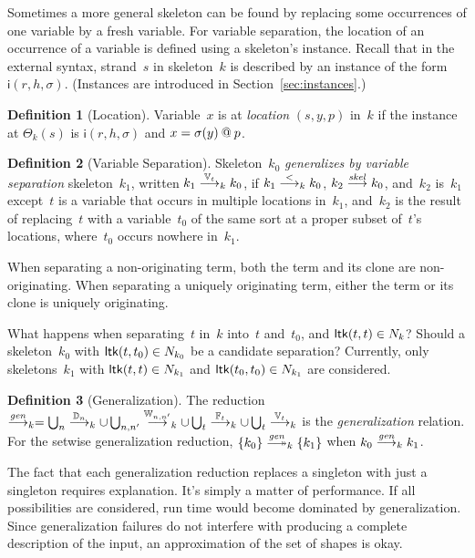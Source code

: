 \documentclass[12pt]{report}
\theoremstyle{definition}
\newtheorem{defn}{Definition}[chapter]
\newenvironment{note}{\itshape\par}{}
\newcommand{\inst}{\mathsf{i}}
\begin{document}
Sometimes a more general skeleton can be found by replacing some
occurrences of one variable by a fresh variable.  For variable
separation, the location of an occurrence of a variable is defined
using a skeleton's instance.  Recall that in the external syntax,
strand~$s$ in skeleton~$k$ is described by an instance of the form
$\inst(r,h,\sigma)$.  (Instances are introduced in
Section~\ref{sec:instances}.)

\begin{defn}[Location]
Variable~$x$ is at \emph{location} $(s,y,p)$ in~$k$ if
the instance at $\Theta_k(s)$ is $\inst(r,h,\sigma)$ and
$x=\sigma(y)\mathbin{@} p$.
\end{defn}

\begin{defn}[Variable Separation]
Skeleton~$k_0$ \emph{generalizes by
  variable separation} skeleton~$k_1$, written
$k_1\stackrel{\mathbb V_t}{\longrightarrow}_k k_0$, if $k_1\stackrel{<}{\longrightarrow}_k k_0$,
$k_2\stackrel{\operatorname{\mathit{skel}}}{\longrightarrow}k_0$, and~$k_2$ is~$k_1$ except~$t$ is a
variable that occurs in multiple locations in~$k_1$, and~$k_2$ is the
result of replacing~$t$ with a variable~$t_0$ of the same sort at a
proper subset of~$t$'s locations, where~$t_0$ occurs nowhere in~$k_1$.
\end{defn}

When separating a non-originating term, both the term and its clone
are non-originating.  When separating a uniquely originating term,
either the term or its clone is uniquely originating.

\begin{note}
What happens when separating~$t$ in~$k$ into~$t$ and~$t_0$, and
$\operatorname{\mathsf{ltk}}(t,t)\in N_k$?  Should a skeleton~$k_0$ with
$\operatorname{\mathsf{ltk}}(t,t_0)\in N_{k_0}$ be a candidate separation?
Currently, only skeletons~$k_1$ with $\operatorname{\mathsf{ltk}}(t,t)\in N_{k_1}$
and $\operatorname{\mathsf{ltk}}(t_0,t_0)\in N_{k_1}$ are considered.
\end{note}

\begin{defn}[Generalization]
The reduction~$\stackrel{\operatorname{\mathit{gen}}}{\longrightarrow}_k
=\bigcup_n\stackrel{\mathbb D_n}{\longrightarrow}_k\cup
\bigcup_{n,n'}\stackrel{\mathbb W_{n,n'}}{\longrightarrow}_k\cup
\bigcup_t\stackrel{\mathbb F_t}{\longrightarrow}_k\cup \bigcup_t\stackrel{\mathbb V_t}{\longrightarrow}_k$
is the \emph{generalization} relation.  For the setwise generalization
reduction, $\{k_0\}\setreduction{\fn{gen}}_k\{k_1\}$ when
$k_0\stackrel{\operatorname{\mathit{gen}}}{\longrightarrow}_k k_1$.
\end{defn}

The fact that each generalization reduction replaces a singleton with
just a singleton requires explanation.  It's simply a matter of
performance.  If all possibilities are considered, {\cpsa} run time
would become dominated by generalization.  Since generalization
failures do not interfere with producing a complete description of the
input, an approximation of the set of shapes is okay.
\end{document}
